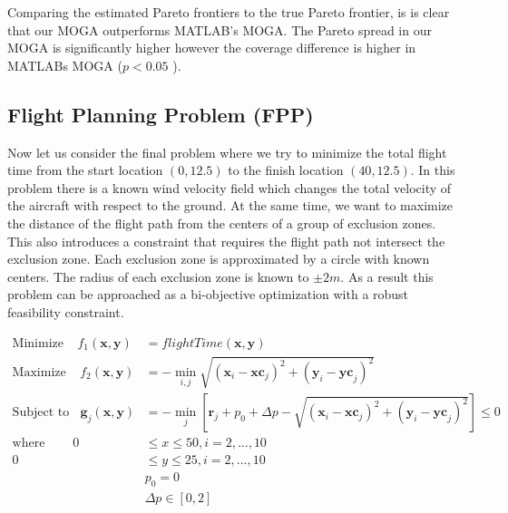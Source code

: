 \documentclass{article}
\begin{document}
\noindent Comparing the estimated Pareto frontiers to the true Pareto frontier, is is clear that our MOGA outperforms MATLAB's MOGA. The Pareto spread in our MOGA is significantly higher however the coverage difference is higher in MATLABs MOGA ($p<0.05$ ).
 
\subsection{Flight Planning Problem (FPP)}
Now let us consider the final problem where we try to minimize the total flight time from the start location $(0,12.5)$ to the finish location $(40,12.5)$.  In this problem there is a known wind velocity field which changes the total velocity of the aircraft with respect to the ground.  At the same time, we want to maximize the distance of the flight path from the centers of a group of exclusion zones. This also introduces a constraint that requires the flight path not intersect the exclusion zone. Each exclusion zone is approximated by a circle with known centers.  The radius of each exclusion zone is known to $\pm 2m$.  As a result this problem can be approached as a bi-objective optimization with a robust feasibility constraint. 

\begin{align*}
\textrm{Minimize} ~~~~~ f_1(\textbf{x},\textbf{y}) &= flightTime(\textbf{x},\textbf{y})\\
\textrm{Maximize} ~~~~~ f_2(\textbf{x},\textbf{y}) &= -\min_{i,j}\sqrt{(\textbf{x}_i-\textbf{xc}_j)^2 + (\textbf{y}_i-\textbf{yc}_j)^2}\\
\textrm{Subject to} ~~~~ \textbf{g}_j(\textbf{x},\textbf{y}) &= -\min_{j}\left[\textbf{r}_j+p_0 + \Delta p -\sqrt{(\textbf{x}_i-\textbf{xc}_j)^2 + (\textbf{y}_i-\textbf{yc}_j)^2}\right]   \leq 0 \\
\textrm{where} ~~~~~~~~~~ 
0 &\leq  x \leq 50, i = 2,...,10 \\
0 &\leq  y  \leq 25, i = 2,...,10 \\
&p_0 = 0\\
&\Delta p \in [0,2] \\
\end{align*}
\end{document}
